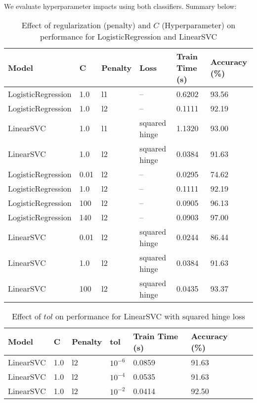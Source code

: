 \documentclass[11pt]{article}
\begin{document}
We evaluate hyperparameter impacts using both classifiers. Summary below:
\begin{table}[h]
\centering
\begin{tabular}{|l|l|l|l|l|l|}
\hline
\textbf{Model} & \textbf{C} & \textbf{Penalty} & \textbf{Loss} & \textbf{Train Time (s)} & \textbf{Accuracy (\%)} \\
\hline
LogisticRegression & 1.0 & l1 & -- & 0.6202 & 93.56 \\
LogisticRegression & 1.0 & l2 & -- & 0.1111 & 92.19 \\

LinearSVC & 1.0 & l1 & squared hinge & 1.1320 & 93.00 \\
LinearSVC & 1.0 & l2 & squared hinge & 0.0384 & 91.63 \\
\hline
LogisticRegression & 0.01 & l2 & -- & 0.0295 & 74.62 \\
LogisticRegression & 1.0 & l2 & -- & 0.1111 & 92.19 \\
LogisticRegression & 100 & l2 & -- & 0.0905 & 96.13 \\
LogisticRegression & 140 & l2 & -- & 0.0903 & 97.00 \\ 
LinearSVC & 0.01 & l2 & squared hinge & 0.0244 & 86.44 \\
LinearSVC & 1.0 & l2 & squared hinge & 0.0384 & 91.63 \\
LinearSVC & 100 & l2 & squared hinge & 0.0435 & 93.37 \\
\hline
\end{tabular}
\vspace{4}
\caption{Effect of regularization (penalty) and $C$ (Hyperparameter) on performance for LogisticRegression and LinearSVC}
\end{table}

\begin{table}[h]
\centering
\begin{tabular}{|l|l|l|l|l|l|l|}
\hline
\textbf{Model} & \textbf{C} & \textbf{Penalty}& \textbf{tol}  & \textbf{Train Time (s)} & \textbf{Accuracy (\%)} \\
\hline
LinearSVC & 1.0 & l2 & $10^{-6}$ & 0.0859 & 91.63 \\
LinearSVC & 1.0 & l2 & $10^{-4}$ & 0.0535 & 91.63 \\
LinearSVC & 1.0 & l2 & $10^{-2}$ & 0.0414 & 92.50 \\
\hline
\end{tabular}
\vspace{3}
\caption{Effect of $tol$ on performance for LinearSVC with squared hinge loss}
\end{table}
\end{document}
